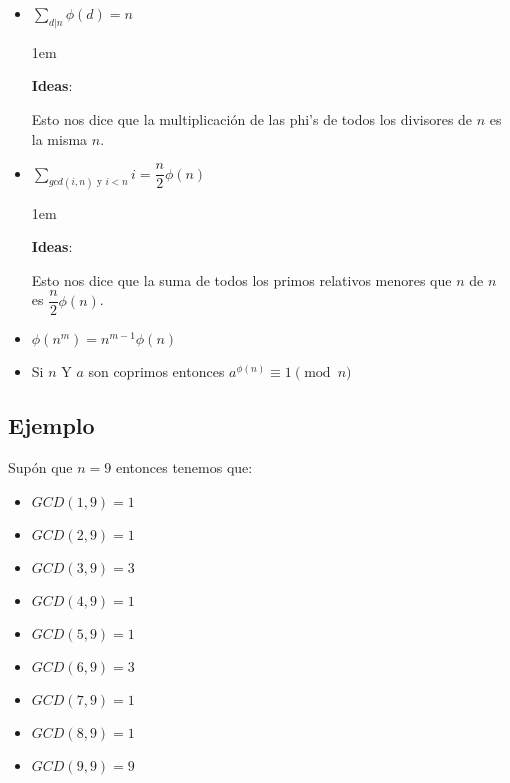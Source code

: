 \documentclass[12pt, fleqn]{report}                             %
\newenvironment{SmallIndentation}[1][0.75em]                    %
    {\begin{adjustwidth}{#1}{}\begin{footnotesize}}                 %
    {\end{footnotesize}\end{adjustwidth}}                           %
\begin{document}
\begin{itemize}
\begin{SmallIndentation}[1em]
                    \end{SmallIndentation}

                \item $\sum_{d | n} \phi(d) =n$
                    \begin{SmallIndentation}[1em]
                        \textbf{Ideas}:

                        Esto nos dice que la multiplicación de las phi's de todos
                        los divisores de $n$ es la misma $n$.

                    \end{SmallIndentation}



                \item $\sum_{gcd(i, n) \text{ y } i < n} i = \dfrac{n}{2} \phi(n)$
                    \begin{SmallIndentation}[1em]
                        \textbf{Ideas}:

                        Esto nos dice que la suma de todos los primos relativos menores que
                        $n$ de $n$ es $\dfrac{n}{2} \phi(n)$.

                    \end{SmallIndentation}

                \item $\phi(n^m) = n^{m-1} \phi(n)$


                \item Si $n$ Y $a$ son coprimos entonces $a^{\phi(n)} \equiv 1 \pmod{n}$

            \end{itemize}





        \clearpage
        \subsection{Ejemplo}
            
            Supón que $n=9$ entonces tenemos que:

            \begin{itemize}
                \item $GCD(1, 9) = 1$
                \item $GCD(2, 9) = 1$
                \item $GCD(3, 9) = 3$
                \item $GCD(4, 9) = 1$
                \item $GCD(5, 9) = 1$
                \item $GCD(6, 9) = 3$
                \item $GCD(7, 9) = 1$
                \item $GCD(8, 9) = 1$
                \item $GCD(9, 9) = 9$
            \end{itemize}
\end{document}
